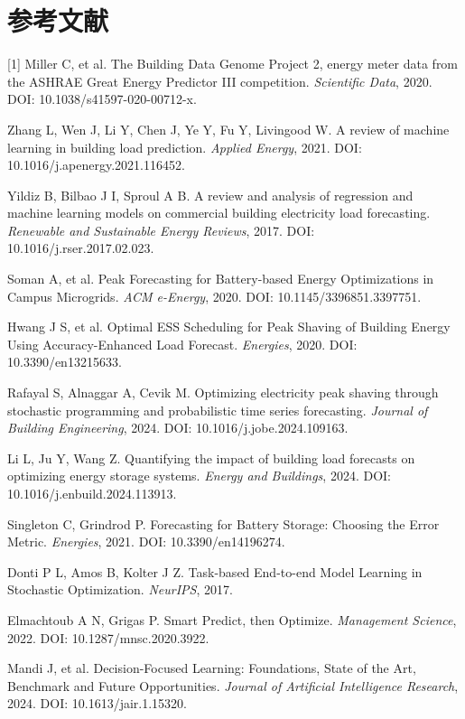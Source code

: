 \documentclass[12pt,a4paper]{article}
\begin{document}
\section{参考文献}
[1] Miller C, et al. The Building Data Genome Project 2, energy meter data from the ASHRAE Great Energy Predictor III competition. \textit{Scientific Data}, 2020. DOI: 10.1038/s41597-020-00712-x.\par
[2] Zhang L, Wen J, Li Y, Chen J, Ye Y, Fu Y, Livingood W. A review of machine learning in building load prediction. \textit{Applied Energy}, 2021. DOI: 10.1016/j.apenergy.2021.116452.\par
[3] Yildiz B, Bilbao J I, Sproul A B. A review and analysis of regression and machine learning models on commercial building electricity load forecasting. \textit{Renewable and Sustainable Energy Reviews}, 2017. DOI: 10.1016/j.rser.2017.02.023.\par
[4] Soman A, et al. Peak Forecasting for Battery-based Energy Optimizations in Campus Microgrids. \textit{ACM e-Energy}, 2020. DOI: 10.1145/3396851.3397751.\par
[5] Hwang J S, et al. Optimal ESS Scheduling for Peak Shaving of Building Energy Using Accuracy-Enhanced Load Forecast. \textit{Energies}, 2020. DOI: 10.3390/en13215633.\par
[6] Rafayal S, Alnaggar A, Cevik M. Optimizing electricity peak shaving through stochastic programming and probabilistic time series forecasting. \textit{Journal of Building Engineering}, 2024. DOI: 10.1016/j.jobe.2024.109163.\par
[7] Li L, Ju Y, Wang Z. Quantifying the impact of building load forecasts on optimizing energy storage systems. \textit{Energy and Buildings}, 2024. DOI: 10.1016/j.enbuild.2024.113913.\par
[8] Singleton C, Grindrod P. Forecasting for Battery Storage: Choosing the Error Metric. \textit{Energies}, 2021. DOI: 10.3390/en14196274.\par
[9] Donti P L, Amos B, Kolter J Z. Task-based End-to-end Model Learning in Stochastic Optimization. \textit{NeurIPS}, 2017.\par
[10] Elmachtoub A N, Grigas P. Smart Predict, then Optimize. \textit{Management Science}, 2022. DOI: 10.1287/mnsc.2020.3922.\par
[11] Mandi J, et al. Decision-Focused Learning: Foundations, State of the Art, Benchmark and Future Opportunities. \textit{Journal of Artificial Intelligence Research}, 2024. DOI: 10.1613/jair.1.15320.\par
\normalsize
\end{document}
